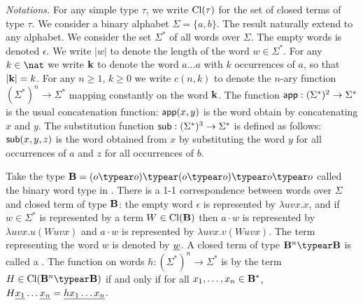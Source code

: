 \emph{Notations.} For any simple type $\tau$, we write
${\rm Cl}(\tau)$ for the set of closed terms of type $\tau$. We
consider a binary alphabet $\Sigma = \{a,b\}$. The result naturally
extend to any alphabet. We consider the set $\Sigma^*$ of all words
over $\Sigma$. The empty words is denoted $\epsilon$. We write $|w|$
to denote the length of the word $w\in\Sigma^*$. For any $k\in \nat$
we write $\mathbf{k}$ to denote the word $a \ldots a$ with $k$
occurrences of $a$, so that $|\mathbf{k}| = k$. For any $n\geq 1$,
$k\geq 0$ we write $c(n,k)$ to denote the $n$-ary function
$(\Sigma^*)^n \rightarrow \Sigma^*$ mapping constantly on the word
$\mathbf{k}$. The function ${\sf app} : (\Sigma^*)^2 \rightarrow
\Sigma^*$ is the usual concatenation function: ${\sf app}(x,y)$ is
the word obtain by concatenating $x$ and $y$. The substitution
function ${\sf sub} : (\Sigma^*)^3 \rightarrow \Sigma^*$ is defined
as follows: ${\sf sub}(x,y,z)$ is the word obtained from $x$ by
substituting the word $y$ for all occurrences of $a$ and $z$ for all
occurrences of $b$.

Take the type $\zaiwordtyp = (o\typear o)\typear (o\typear o)\typear
o\typear o$ called the binary word type in
\cite{DBLP:journals/tcs/Zaionc87}. There is a 1-1 correspondence
between words over $\Sigma$ and closed term of type $\mathbf{B}$:
the empty word $\epsilon$ is represented by $\lambda u v x.x$, and
if $w\in \Sigma^*$ is represented by a term $W \in
{\rm Cl}(\mathbf{B})$ then $a \cdot w$ is represented by $\lambda
u v x. u(W uvx)$ and $a \cdot w$ is represented by $\lambda u v x.
v(W uvx)$. The term representing the word $w$ is denoted by
$\underline{w}$. A closed term of type $\zaiwordtyp^n \typear
\zaiwordtyp$ is called a . The function on words $h:(\Sigma^*)^n \rightarrow
\Sigma^*$ is  by the term $H \in
\closedof{\zaiwordtyp^n \typear \zaiwordtyp}$ if and only if for all
$x_1, \ldots, x_n \in \mathbf{B}^*$, $H \underline{x_1} \ldots
\underline{x_n} = \underline{h x_1 \ldots x_n}$. \bigskip

